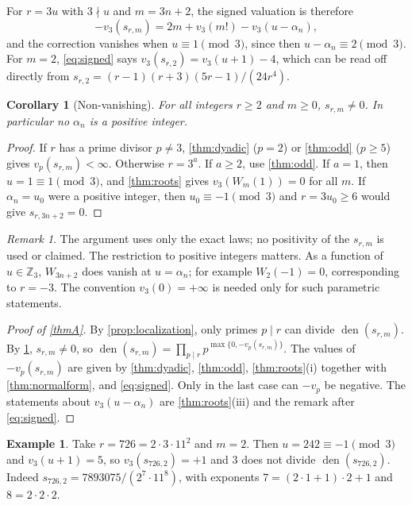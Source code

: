 \documentclass[11pt,reqno]{amsart}
\newtheorem{corollary}[theorem]{Corollary}
\theoremstyle{definition}
\newtheorem{example}[theorem]{Example}
\theoremstyle{remark}
\newtheorem{remark}[theorem]{Remark}
\theoremstyle{plain}
\newcommand{\Z}{\mathbb Z}
\newcommand{\den}{\operatorname{den}}
\begin{document}
For $r=3u$ with $3\nmid u$ and $m=3n+2$, the signed valuation is therefore
\begin{equation}\label{eq:signed}
-v_3(s_{r,m})=2m+v_3(m!)-v_3(u-\alpha_n),
\end{equation}
and the correction vanishes when $u\equiv1\pmod 3$, since then $u-\alpha_n\equiv2\pmod 3$. For $m=2$, \eqref{eq:signed} says $v_3(s_{r,2})=v_3(u+1)-4$, which can be read off directly from $s_{r,2}=(r-1)(r+3)(5r-1)/(24r^4)$.

\begin{corollary}[Non-vanishing]\label{cor:nonvanishing}
For all integers $r\ge2$ and $m\ge0$, $s_{r,m}\ne0$. In particular no $\alpha_n$ is a positive integer.
\end{corollary}

\begin{proof}
If $r$ has a prime divisor $p\ne3$, \cref{thm:dyadic} ($p=2$) or \cref{thm:odd} ($p\ge5$) gives $v_p(s_{r,m})<\infty$. Otherwise $r=3^a$. If $a\ge2$, use \cref{thm:odd}. If $a=1$, then $u=1\equiv1\pmod 3$, and \cref{thm:roots} gives $v_3(W_m(1))=0$ for all $m$. If $\alpha_n=u_0$ were a positive integer, then $u_0\equiv-1\pmod3$ and $r=3u_0\ge6$ would give $s_{r,3n+2}=0$.
\end{proof}

\begin{remark}
The argument uses only the exact laws; no positivity of the $s_{r,m}$ is used or claimed. The restriction to positive integers matters. As a function of $u\in\Z_3$, $W_{3n+2}$ does vanish at $u=\alpha_n$; for example $W_2(-1)=0$, corresponding to $r=-3$. The convention $v_3(0)=+\infty$ is needed only for such parametric statements.
\end{remark}

\begin{proof}[Proof of \cref{thmA}]
By \cref{prop:localization}, only primes $p\mid r$ can divide $\den(s_{r,m})$. By \cref{cor:nonvanishing}, $s_{r,m}\neq0$, so $\den(s_{r,m})=\prod_{p\mid r}p^{\max\{0,-v_p(s_{r,m})\}}$. The values of $-v_p(s_{r,m})$ are given by \cref{thm:dyadic}, \cref{thm:odd}, \cref{thm:roots}(i) together with \cref{thm:normalform}, and \eqref{eq:signed}. Only in the last case can $-v_p$ be negative. The statements about $v_3(u-\alpha_n)$ are \cref{thm:roots}(iii) and the remark after \eqref{eq:signed}.
\end{proof}

\begin{example}\label{ex:726}
Take $r=726=2\cdot3\cdot11^2$ and $m=2$. Then $u=242\equiv-1\pmod 3$ and $v_3(u+1)=5$, so $v_3(s_{726,2})=+1$ and $3$ does not divide $\den(s_{726,2})$. Indeed $s_{726,2}=7893075/(2^7\cdot11^8)$, with exponents $7=(2\cdot1+1)\cdot2+1$ and $8=2\cdot2\cdot2$.
\end{example}
\end{document}
